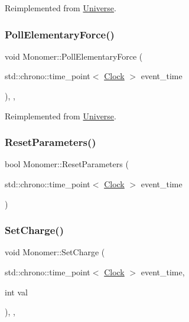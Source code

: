 Reimplemented from \mbox{\hyperlink{classUniverse_a645299738e6b798a037f2a15a2e7cf4d}{Universe}}.

\mbox{\label{classMonomer_a5b2375df1e19abdf6045c475d2ac23ca}} 
\subsubsection{\texorpdfstring{Poll\+Elementary\+Force()}{PollElementaryForce()}}
{\footnotesize\ttfamily void Monomer\+::\+Poll\+Elementary\+Force (\begin{DoxyParamCaption}\item[{std\+::chrono\+::time\+\_\+point$<$ \mbox{\hyperlink{universe_8h_a0ef8d951d1ca5ab3cfaf7ab4c7a6fd80}{Clock}} $>$}]{event\+\_\+time }\end{DoxyParamCaption})\hspace{0.3cm}{\ttfamily [inline]}, {\ttfamily [final]}, {\ttfamily [virtual]}}



Reimplemented from \mbox{\hyperlink{classUniverse_a0c485c504542409cbb5cfd8543c35b11}{Universe}}.

\mbox{\label{classMonomer_a16a692cf11117581c9b4ebbed3c04c9c}} 
\subsubsection{\texorpdfstring{Reset\+Parameters()}{ResetParameters()}}
{\footnotesize\ttfamily bool Monomer\+::\+Reset\+Parameters (\begin{DoxyParamCaption}\item[{std\+::chrono\+::time\+\_\+point$<$ \mbox{\hyperlink{universe_8h_a0ef8d951d1ca5ab3cfaf7ab4c7a6fd80}{Clock}} $>$}]{event\+\_\+time }\end{DoxyParamCaption})}

\mbox{\label{classMonomer_a1ee35c888318e590082e6cd1772bb430}} 
\subsubsection{\texorpdfstring{Set\+Charge()}{SetCharge()}}
{\footnotesize\ttfamily void Monomer\+::\+Set\+Charge (\begin{DoxyParamCaption}\item[{std\+::chrono\+::time\+\_\+point$<$ \mbox{\hyperlink{universe_8h_a0ef8d951d1ca5ab3cfaf7ab4c7a6fd80}{Clock}} $>$}]{event\+\_\+time,  }\item[{int}]{val }\end{DoxyParamCaption})\hspace{0.3cm}{\ttfamily [inline]}, {\ttfamily [final]}, {\ttfamily [virtual]}}



